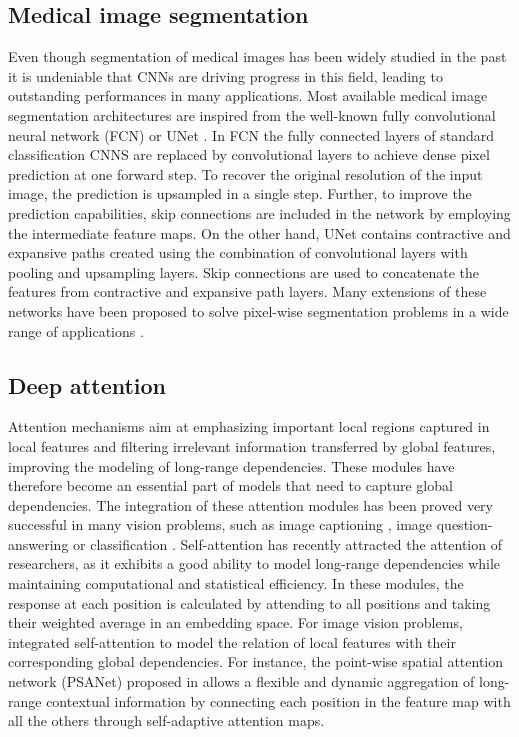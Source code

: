 \documentclass[journal]{IEEEtran}
\begin{document}
\subsection{Medical image segmentation}
Even though segmentation of medical images has been widely studied in the past \cite{heimann2009statistical, dolz2015segmentation} it is undeniable that CNNs are driving progress in this field, leading to outstanding performances in many applications. Most available medical image segmentation architectures are inspired from the well-known fully convolutional neural network (FCN) \cite{FCN} or UNet \cite{ronneberger2015u}. In FCN the fully connected layers of standard classification CNNS are replaced by convolutional layers to achieve dense pixel prediction at one forward step. To recover the original resolution of the input image, the prediction is upsampled in a single step. Further, to improve the prediction capabilities, skip connections are included in the network by employing the intermediate feature maps. On the other hand, UNet contains contractive and expansive paths created using the combination of convolutional layers with pooling and upsampling layers. Skip connections are used to concatenate the features from contractive and expansive path layers. Many extensions of these networks have been proposed to solve pixel-wise segmentation problems in a wide range of applications \cite{fechter2017esophagus,li2018h,man2019deep,dolz20183d,carass2018comparing,zotti2018convolutional,dolz2018multiregion,jin2019accurate,heinrich2019obelisk,wang2019abdominal}.  


\subsection{Deep attention}

Attention mechanisms aim at emphasizing important local regions captured in local features and filtering irrelevant information transferred by global features, improving the modeling of long-range dependencies. These modules have therefore become an essential part of models that need to capture global dependencies. The integration of these attention modules has been proved very successful in many vision problems, such as image captioning \cite{pedersoli2017areas}, image question-answering \cite{yang2016stacked} or classification \cite{wang2017residual}. Self-attention \cite{parikh2016decomposable,vaswani2017attention,wang2018non} has recently attracted the attention of researchers, as it exhibits a good ability to model long-range dependencies while maintaining computational and statistical efficiency. In these modules, the response at each position is calculated by attending to all positions and taking their weighted average in an embedding space. For image vision problems, \cite{zhao2018psanet,fu2018dual} integrated self-attention to model the relation of local features with their corresponding global dependencies. For instance, the point-wise spatial attention network (PSANet) proposed in \cite{zhao2018psanet} allows a flexible and dynamic aggregation of long-range contextual information by connecting each position in the feature map with all the others through self-adaptive attention maps.
\end{document}

